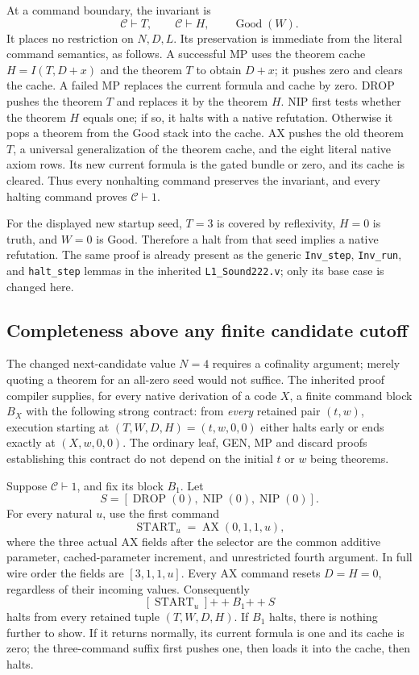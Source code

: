 At a command boundary, the invariant is
\[
 \mathcal C\vdash T,\qquad
 \mathcal C\vdash H,\qquad
 \operatorname{Good}(W).
\]
It places no restriction on $N,D,L$. Its preservation is immediate from
the literal command semantics, as follows. A successful MP uses the
theorem cache $H=I(T,D+x)$ and the theorem $T$ to obtain $D+x$;
it pushes zero and clears the cache. A failed MP replaces the current
formula and cache by zero. DROP pushes the theorem $T$ and replaces
it by the theorem $H$. NIP first tests whether the theorem $H$ equals
one; if so, it halts with a native refutation. Otherwise it pops a
theorem from the Good stack into the cache. AX pushes the old theorem
$T$, a universal generalization of the theorem cache, and the eight
literal native axiom rows. Its new current formula is the gated bundle
or zero, and its cache is cleared. Thus every nonhalting command
preserves the invariant, and every halting command proves
$\mathcal C\vdash1$.

For the displayed new startup seed, $T=3$ is covered by reflexivity,
$H=0$ is truth, and $W=0$ is Good. Therefore a halt from that seed
implies a native refutation. The same proof is already present as the
generic \texttt{Inv\_step}, \texttt{Inv\_run}, and \texttt{halt\_step}
lemmas in the inherited \texttt{L1\_Sound222.v}; only its base case is
changed here.

\subsection{Completeness above any finite candidate cutoff}

The changed next-candidate value $N=4$ requires a cofinality argument;
merely quoting a theorem for an all-zero seed would not suffice. The
inherited proof compiler supplies, for every native derivation of a code
$X$, a finite command block $B_X$ with the following strong contract:
from \emph{every} retained pair $(t,w)$, execution starting at
$(T,W,D,H)=(t,w,0,0)$ either halts early or ends exactly at
$(X,w,0,0)$. The ordinary leaf, GEN, MP and discard proofs establishing
this contract do not depend on the initial $t$ or $w$ being theorems.

Suppose $\mathcal C\vdash1$, and fix its block $B_1$. Let
\[
 S=[\operatorname{DROP}(0),\operatorname{NIP}(0),
                         \operatorname{NIP}(0)].
\]
For every natural $u$, use the first command
\[
 \operatorname{START}_u=\operatorname{AX}(0,1,1,u),
\]
where the three actual AX fields after the selector are the common
additive parameter, cached-parameter increment, and unrestricted fourth
argument. In full wire order the fields are $[3,1,1,u]$.
Every AX command resets $D=H=0$, regardless of their incoming values.
Consequently
\[
 [\operatorname{START}_u]\mathbin{+\!+}B_1\mathbin{+\!+}S
\]
halts from every retained tuple $(T,W,D,H)$. If $B_1$ halts, there is
nothing further to show. If it returns normally, its current formula
is one and its cache is zero; the three-command suffix first pushes
one, then loads it into the cache, then halts.


